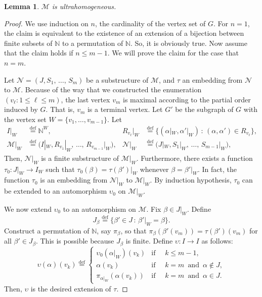 \documentclass[10pt]{amsart}
\newtheorem{lemm}[theo]{Lemma}\newtheorem{prop}[theo]{Proposition}\newtheorem{coro}[theo]{Corollary}\newtheorem{conj}[theo]{Conjecture}
\theoremstyle{definition}\newtheorem{defi}[theo]{Definition}\newtheorem{rema}[theo]{Remark}\newtheorem{exam}[theo]{Example}\newtheorem{exem}[theo]{Example}\newtheorem{nota}[theo]{Notation}
\newcommand*{\defeq}{\stackrel{\mathrm{def}}{=}}
\newcommand*\N{\mathbb{N}}
\newcommand*\NN{\mathcal{N}}
\newcommand*\MM{\mathcal{M}}
\newcommand*\M{\MM}
\begin{document}
\begin{lemm}\label{lem: ultrahomogeneity}
$\M$ is ultrahomogeneous.
\end{lemm}
\begin{proof}
We use induction on $n$, the cardinality of the vertex set of $G$. For $n=1$, the claim is equivalent to the existence of an extension of a bijection between finite subsets of $\N$ to a permutation of $\N$. So, it is obviously true. Now assume that the claim holds if $n\leq m-1$. We will prove the claim for the case that $n = m$.

Let $\NN = (J,S_1,\,\ldots,\,S_m)$ be a substructure of $\MM$, and $\tau$ an embedding from $\NN$ to $\MM$. Because of the way that we constructed the enumeration $(v_\ell : 1\leq \ell \leq m)$, the last vertex $v_m$ is maximal according to the partial order induced by $G$. That is, $v_m$ is a terminal vertex. Let $G'$ be the subgraph of $G$ with the vertex set $W=\{v_1,\ldots,v_{m-1}\}$. Let
\begin{align*}
I|_W &
\defeq \N^{W}, & R_{v_\ell}|_W &
\defeq \big\{(\alpha|_W,\alpha'|_W)\,:\,(\alpha,\alpha') \in R_{v_\ell}\big\},
\\
\MM|_{W} &
\defeq \big(I|_W,R_{v_1}|_W,\,\ldots,\,R_{v_{m-1}}|_W\big), &
\NN|_{W} &
\defeq \big(J|_W,S_1|_W,\,\ldots,\,S_{m-1}|_W\big),
\end{align*}
Then, $\NN|_W$ is a finite substructure of $\MM|_W$. Furthermore, there exists a function $\tau_0 : J|_W \to I_W$ such that $\tau_0(\beta)=\tau(\beta')|_W$ whenever $\beta = \beta'|_W$. In fact, the function $\tau_0$ is an embedding from $\NN|_W$ to $\MM|_W$. By induction hypothesis, $\tau_0$ can be extended to an automorphism $\upsilon_0$ on $\MM|_W$.

We now extend $\upsilon_0$ to an automorphism on $\MM$. Fix $\beta \in J|_W$. Define
\[
J_\beta
\defeq \{\beta' \in J\,:\,\beta'|_{W}=\beta\}.
\]
Construct a permutation of $\N$, say $\pi_\beta$, so that $\pi_\beta(\beta'(v_m))=\tau(\beta')(v_m)$ for all $\beta' \in J_\beta$. This is possible because $J_\beta$ is finite. Define $\upsilon : I \to I$ as follows:
\[
\upsilon(\alpha)(v_k)
\defeq
\begin{cases}
\upsilon_0(\alpha|_W)(v_k) & \text{if }\quad k \leq m-1,
\\
\alpha(v_k) & \text{if }\quad k = m\, \text{ and }\, \alpha \notin J,
\\
\pi_{\alpha|_W}(\alpha(v_k)) & \text{if }\quad k = m\, \text{ and }\, \alpha \in J.
\end{cases}
\]
Then, $\upsilon$ is the desired extension of $\tau$.
\end{proof}
\end{document}
